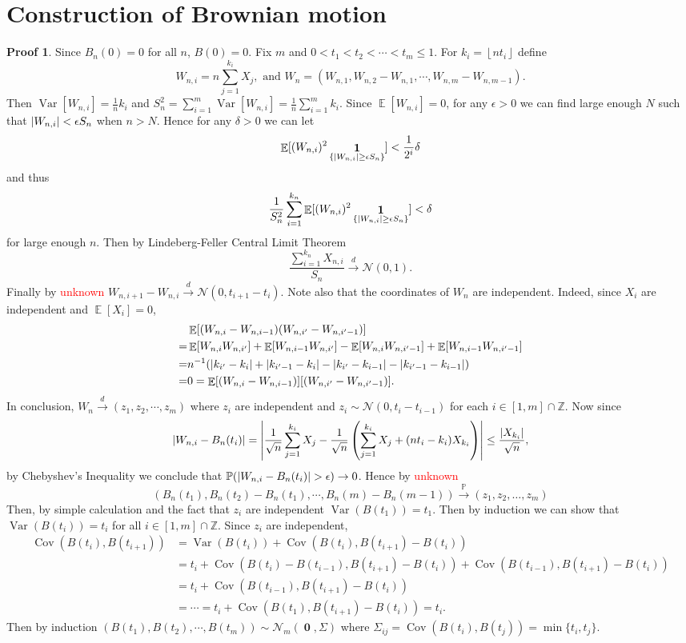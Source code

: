 \documentclass[hidelinks,11pt]{article}
\theoremstyle{definition}
\theoremstyle{dotless}
\newtheorem{prop}{Proof}[section]
\theoremstyle{remark}
\DeclareMathOperator{\Var}{Var}
\DeclareMathOperator{\Cov}{Cov}
\DeclareMathOperator{\E}{\mathbb{E}}
\DeclareMathOperator{\1}{\mathbf{1}}
\DeclareMathOperator{\0}{\mathbf{0}}
\begin{document}
\section{Construction of Brownian motion}

\begin{prop}
Since $B_n(0)=0$ for all $n$, $B(0)=0$.\medbreak
Fix $m$ and $0<t_1<t_2<\cdots<t_m\leq1$. For $k_i=\left\lfloor{nt_i}\right\rfloor$ define
\[W_{n,i}=n\sum_{j=1}^{k_i}X_j,\textrm{ and }W_n=(W_{n,1},W_{n,2}-W_{n,1},\cdots,W_{n,m}-W_{n,m-1}).\]
Then $\Var[W_{n,i}]=\frac{1}{n}k_i$ and $S_n^2=\sum_{i=1}^m\Var[W_{n,i}]=\frac{1}{n}\sum_{i=1}^mk_i$. Since $\E[W_{n,i}]=0$, for any $\epsilon>0$ we can find large enough $N$ such that $\abs{W_{n,i}}<\epsilon S_n$ when $n>N$. Hence for any $\delta>0$ we can let
\[\E[(W_{n,i})^2\1_{\{\abs{W_{n,i}}\geq\epsilon S_n\}}]<\frac{1}{2^i}\delta\]
and thus
\[\frac{1}{S_n^2}\sum_{i=1}^{k_n}\E[(W_{n,i})^2\1_{\{\abs{W_{n,i}}\geq\epsilon S_n\}}]<\delta\]
for large enough $n$. Then by Lindeberg-Feller Central Limit Theorem
\[\frac{\sum_{i=1}^{k_n}X_{n,i}}{S_n}\xrightarrow{d}\mathcal{N}(0,1).\]
Finally by \textcolor{red}{unknown} $W_{n,i+1}-W_{n,i}\xrightarrow{d}\mathcal{N}(0,t_{i+1}-t_i)$. Note also that the coordinates of $W_n$ are independent. Indeed, since $X_i$ are independent and $\E[X_i]=0$,
\begin{align*}
&\E[(W_{n,i}-W_{n,i-1})(W_{n,i'}-W_{n,i'-1})]\\
=&\E[W_{n,i}W_{n,i'}]+\E[W_{n,i-1}W_{n,i'}]-\E[W_{n,i}W_{n,i'-1}]+\E[W_{n,i-1}W_{n,i'-1}]\\
=&n^{-1}(\abs{k_{i'}-k_i}+\abs{k_{i'-1}-k_i}-\abs{k_{i'}-k_{i-1}}-\abs{k_{i'-1}-k_{i-1}})\\
=&0=\E[(W_{n,i}-W_{n,i-1})][(W_{n,i'}-W_{n,i'-1})].
\end{align*}
In conclusion, $W_n\xrightarrow{d}(z_1,z_2,\cdots,z_m)$ where $z_i$ are independent and $z_i\sim\mathcal{N}(0,t_i-t_{i-1})$ for each $i\in[1,m]\cap\mathbb{Z}$.
\medbreak
Now since
\[\abs{W_{n,i}-B_n(t_i)}=\abs{\frac{1}{\sqrt{n}}\sum_{j=1}^{k_i}X_j-\frac{1}{\sqrt{n}}\left(\sum_{j=1}^{k_i}X_j+(nt_i-k_i)X_{k_i}\right)}\leq\frac{\abs{X_{k_i}}}{\sqrt{n}},\]
by Chebyshev's Inequality we conclude that $\mathbb{P}(\abs{W_{n,i}-B_n(t_i)}>\epsilon)\to0$. Hence by \textcolor{red}{unknown}
\[(B_n(t_1),B_n(t_2)-B_n(t_1),\cdots,B_n(m)-B_n(m-1))\xrightarrow{\mathbb{P}}(z_1,z_2,\dots,z_m)\]
\medbreak
Then, by simple calculation and the fact that $z_i$ are independent $\Var(B(t_1))=t_1$. Then by induction we can show that $\Var(B(t_i))=t_i$ for all $i\in[1,m]\cap\mathbb{Z}$. Since $z_i$ are independent,
\begin{align*}
\Cov(B(t_i),B(t_{i+1}))&=\Var(B(t_i))+\Cov(B(t_i),B(t_{i+1})-B(t_i))\\
&=t_i+\Cov(B(t_i)-B(t_{i-1}),B(t_{i+1})-B(t_i))+\Cov(B(t_{i-1}),B(t_{i+1})-B(t_i))\\
&=t_i+\Cov(B(t_{i-1}),B(t_{i+1})-B(t_i))\\
&=\cdots=t_i+\Cov(B(t_1),B(t_{i+1})-B(t_i))=t_i.
\end{align*}
Then by induction $(B(t_1),B(t_2),\cdots,B(t_m))\sim\mathcal{N}_m(\0,\Sigma)$ where $\Sigma_{ij}=\Cov(B(t_i),B(t_j))=\min\{t_i,t_j\}$.
\end{prop}
\end{document}

